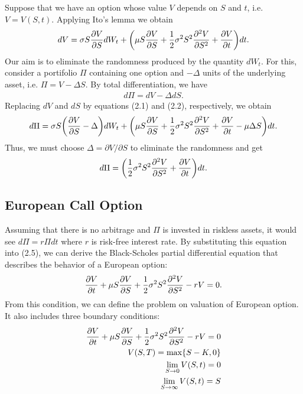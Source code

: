 \documentclass[11pt,letter]{article}
\def\D{\Delta} \def\G{\Gamma} \def\W{\Omega} \def\P{\Phi} \def\L{\Lambda} \def\Th{\Theta} \def\z{\zeta}
\theoremstyle{definition}
\theoremstyle{remark}
\numberwithin{equation}{section}
\begin{document}
Suppose that we have an option whose value $V$ depends on $S$ and $t$, i.e. $V=V(S,t)$. Applying Ito's lemma we obtain
\begin{align}
    dV=\sigma S\frac{\partial V}{\partial S}dW_t+\bigg(\mu S\frac{\partial V}{\partial S}+\frac{1}{2}\sigma^2S^2\frac{\partial^2V}{\partial S^2}+\frac{\partial V}{\partial t}\bigg)dt.
\end{align}
Our aim is to eliminate the randomness produced by the quantity $dW_t$. For this, consider a portifolio $\Pi$ containing one option and $-\D$ units of the underlying asset, i.e. $\Pi=V-\D S$. By total differentiation, we have
\begin{align}
    d\Pi=dV-\D dS.
\end{align}
Replacing $dV$ and $dS$ by equations (2.1) and (2.2), respectively, we obtain
\begin{align}
    d\Pi=\s S\bigg(\frac{\partial V}{\partial S}-\D\bigg)dW_t+\bigg(\m S\frac{\partial V}{\partial S}+\frac{1}{2}\s^2S^2\frac{\partial^2V}{\partial S^2}+\frac{\partial V}{\partial t}-\m\D S\bigg)dt.
\end{align}
Thus, we must choose $\D=\partial V/\partial S$ to eliminate the randomness and get
\begin{align}
    d\Pi=\bigg(\frac{1}{2}\sigma^2S^2\frac{\partial^2V}{\partial S^2}+\frac{\partial V}{\partial t}\bigg)dt.
\end{align}

\subsection{European Call Option}
Assuming that there is no arbitrage and $\Pi$ is invested in riskless assets, it would see $d\Pi=r\Pi dt$ where $r$ is risk-free interest rate. By substituting this equation into (2.5), we can derive the Black-Scholes partial differential equation that describes the behavior of a European option:
\begin{align}
    \frac{\partial V}{\partial t}+\mu S\frac{\partial V}{\partial S}+\frac{1}{2}\sigma^2S^2\frac{\partial^2V}{\partial S^2}-r V=0.
\end{align}
From this condition, we can define the problem on valuation of European option. It also includes three boundary conditions:
\begin{align}
    \frac{\partial V}{\partial t}+\mu S\frac{\partial V}{\partial S}+\frac{1}{2}\sigma^2S^2\frac{\partial^2V}{\partial S^2}-r V=0\\
    V(S,T)=\max\{S-K,0\}\\
    \lim_{S\rightarrow0}V(S,t)=0\\
    \lim_{S\rightarrow\infty}V(S,t)=S
\end{align}
\end{document}
